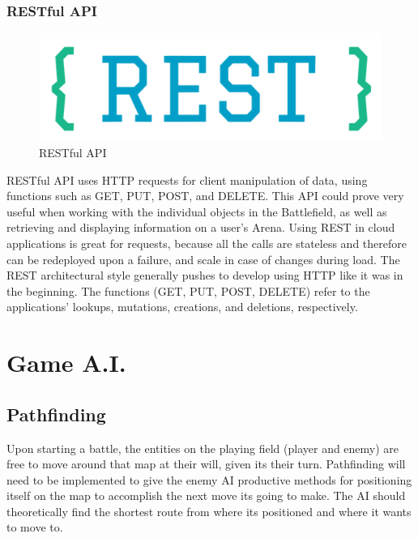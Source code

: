 \documentclass[12pt,a4paper]{report}
\begin{document}
			\subsubsection{RESTful API}
			\begin{figure}
				\includegraphics[scale=0.3]{restful}
				\caption{RESTful API}
				\label{fig: RESTful API)}
			\end{figure}
			RESTful API uses HTTP requests for client manipulation of data, using functions such as GET, PUT, POST, and DELETE. This API could prove very useful when working with the individual objects in the Battlefield, as well as retrieving and displaying information on a user's Arena. Using REST in cloud applications is great for requests, because all the calls are stateless and therefore can be redeployed upon a failure, and scale in case of changes during load. The REST architectural style generally pushes to develop using HTTP like it was in the beginning. The functions (GET, PUT, POST, DELETE) refer to the applications' lookups, mutations, creations, and deletions, respectively.
			
	\section{Game A.I.}
		\subsection{Pathfinding}
			
			Upon starting a battle, the entities on the playing field (player and enemy) are free to move around that map at their will, given its their turn. Pathfinding will need to be implemented to give the enemy AI productive methods for positioning itself on the map to accomplish the next move its going to make. The AI should theoretically find the shortest route from where its positioned and where it wants to move to.
			
\end{document}
